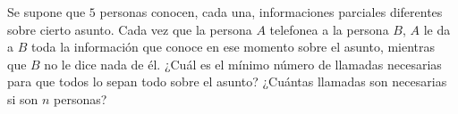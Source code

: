 Se supone que $5$ personas conocen, cada una, informaciones parciales diferentes sobre cierto asunto. Cada vez que la persona $A$ telefonea a la persona $B$, $A$ le da a $B$ toda la información que conoce en ese momento sobre el asunto, mientras que $B$ no le dice nada de él. ¿Cuál es el mínimo número de llamadas necesarias para que todos lo sepan todo sobre el asunto? ¿Cuántas llamadas son necesarias si son $n$ personas?
